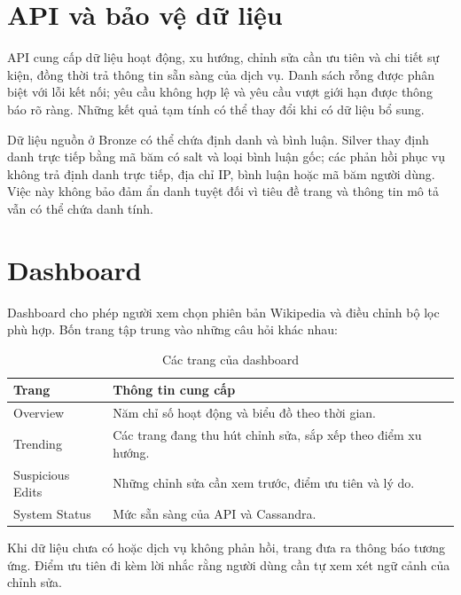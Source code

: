 \section{API và bảo vệ dữ liệu}
API cung cấp dữ liệu hoạt động, xu hướng, chỉnh sửa cần ưu tiên và chi tiết sự kiện, đồng thời trả thông tin sẵn sàng của dịch vụ. Danh sách rỗng được phân biệt với lỗi kết nối; yêu cầu không hợp lệ và yêu cầu vượt giới hạn được thông báo rõ ràng. Những kết quả tạm tính có thể thay đổi khi có dữ liệu bổ sung.

Dữ liệu nguồn ở Bronze có thể chứa định danh và bình luận. Silver thay định danh trực tiếp bằng mã băm có salt và loại bình luận gốc; các phản hồi phục vụ không trả định danh trực tiếp, địa chỉ IP, bình luận hoặc mã băm người dùng. Việc này không bảo đảm ẩn danh tuyệt đối vì tiêu đề trang và thông tin mô tả vẫn có thể chứa danh tính.
\clearpage
\section{Dashboard}
Dashboard cho phép người xem chọn phiên bản Wikipedia và điều chỉnh bộ lọc phù hợp. Bốn trang tập trung vào những câu hỏi khác nhau:

\begin{table}[H]\centering\small
\caption{Các trang của dashboard}\label{tab:dashboard}
\begin{tabularx}{\linewidth}{@{}lX@{}}\toprule
\textbf{Trang} & \textbf{Thông tin cung cấp} \\ \midrule
Overview & Năm chỉ số hoạt động và biểu đồ theo thời gian. \\
Trending & Các trang đang thu hút chỉnh sửa, sắp xếp theo điểm xu hướng. \\
Suspicious Edits & Những chỉnh sửa cần xem trước, điểm ưu tiên và lý do. \\
System Status & Mức sẵn sàng của API và Cassandra. \\
\bottomrule\end{tabularx}\end{table}

Khi dữ liệu chưa có hoặc dịch vụ không phản hồi, trang đưa ra thông báo tương ứng. Điểm ưu tiên đi kèm lời nhắc rằng người dùng cần tự xem xét ngữ cảnh của chỉnh sửa.
